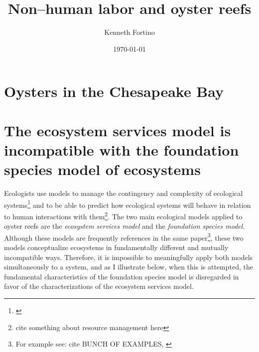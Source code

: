 \documentclass{article}
\begin{document}
\title{Non--human labor and oyster reefs}
\author{Kenneth Fortino}
\date{\today}

\maketitle

\section{Oysters in the Chesapeake Bay}

\section{The ecosystem services model is incompatible with the foundation species model of ecosystems}

Ecologists use models to manage the contingency and complexity of ecological systems\footnote{\cite{lawton_laws_1999}} and to be able to predict how ecological systems will behave in relation to human interactions with them\footnote{cite something about resource management here}. The two main ecological models applied to oyster reefs are the \emph{ecosystem services model} and the \emph{foundation species model}. Although these models are frequently references in the same paper\footnote{For example see: cite BUNCH OF EXAMPLES, \cite{angelini_interactions_2011}}, these two models conceptualize ecosystems in fundamentally different and mutually incompatible ways. Therefore, it is impossible to meaningfully apply both models simultaneously to a system, and as I illustrate below, when this is attempted, the fundamental characteristics of the foundation species model is disregarded in favor of the characterizations of the ecosystem services model.
\end{document}
